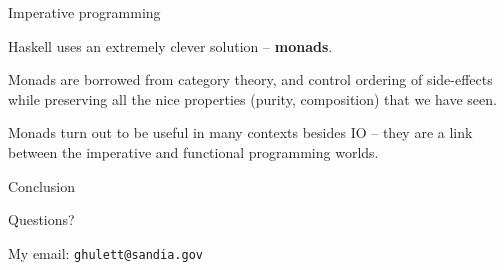 %
\begin{frame}[fragile]{Imperative programming}

Haskell uses an extremely clever solution -- \textbf{monads}.

Monads are borrowed from category theory, and control ordering of side-effects
while preserving all the nice properties (purity, composition) that we have
seen.

Monads turn out to be useful in many contexts besides IO -- they are a link
between the imperative and functional programming worlds.

\end{frame}

%
\begin{frame}{Conclusion}

Questions?

My email: \texttt{ghulett@sandia.gov}

\end{frame}
